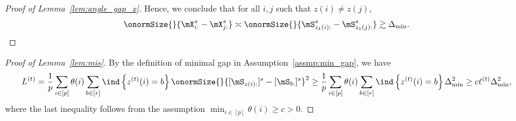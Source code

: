 \documentclass[lettersize,onecolumn,journal]{IEEEtran}
\theoremstyle{definition}
\theoremstyle{definition}
\newcommand{\offf}[1]{\left\{#1\right\}}
\newcommand{\ang}[1]{\left\langle#1\right\rangle}
\begin{document}
{\begin{proof}[Proof of Lemma~\ref{lem:angle_gap_x}]
{Hence, we conclude that for all $i,j$ such that $z(i) \neq z(j)$,
\begin{equation}
    \onormSize{}{\mX_{i:}^s - \mX_{j:}^s} \asymp \onormSize{}{\mS_{z_1(i):}^s - \mS_{z_1(j):}^s} \gtrsim  \Delta_{\min}.
\end{equation}

}

\end{proof}

\begin{proof}[Proof of Lemma~\ref{lem:mis}]
By the definition of minimal gap in Assumption~\ref{assmp:min_gap}, we have 
\begin{equation}
         L^{(t)} = \frac{1}{p}  \sum_{i \in [p]} \theta(i) \sum_{b \in [r]}  \ind \offf{ z^{(t)}(i) = b } \onormSize{}{ [ \mS_{ z(i):}  ]^s - [ \mS_{b:}  ]^s  }^2 \geq \frac{1}{p}  \sum_{i \in [p]} \theta(i) \sum_{b \in [r]}  \ind \offf{ z^{(t)}(i) = b } \Delta_{\min}^2 \geq c \ell^{(t)} \Delta_{\min}^2,
    \end{equation}
    where the last inequality follows from the assumption $\min_{i \in [p]} \theta(i) \geq c>0$.
\end{proof}


}

\end{document}
